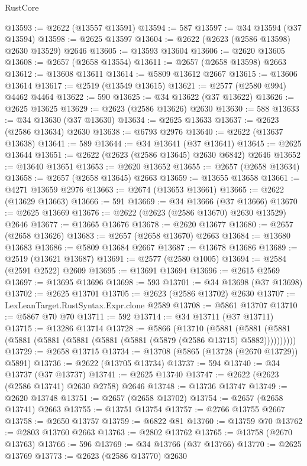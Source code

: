 \begin{lexlean}{RustCore}
\begin{coremodule}
@13593 := @2622 (@13557 @13591)
@13594 := 587
@13597 := @34 @13594 (@37 @13594)
@13598 := @2625 @13597
@13604 := @2622 (@2623 (@2586 @13598) @2630 @13529) @2646
@13605 := @13593 @13604
@13606 := @2620 @13605
@13608 := @2657 (@2658 @13554)
@13611 := @2657 (@2658 @13598) @2663
@13612 := @13608 @13611
@13614 := @5809 @13612 @2667
@13615 := @13606 @13614
@13617 := @2519 (@13549 @13615)
@13621 := @2577 (@2580 @994) @4462 @4464
@13622 := 590
@13625 := @34 @13622 (@37 @13622)
@13626 := @2625 @13625
@13629 := @2623 (@2586 @13626) @2630
@13630 := 588
@13633 := @34 @13630 (@37 @13630)
@13634 := @2625 @13633
@13637 := @2623 (@2586 @13634) @2630
@13638 := @6793 @2976
@13640 := @2622 (@13637 @13638)
@13641 := 589
@13644 := @34 @13641 (@37 @13641)
@13645 := @2625 @13644
@13651 := @2622 (@2623 (@2586 @13645) @2630 @6842) @2646
@13652 := @13640 @13651
@13653 := @2620 @13652
@13655 := @2657 (@2658 @13634)
@13658 := @2657 (@2658 @13645) @2663
@13659 := @13655 @13658
@13661 := @4271 @13659 @2976
@13663 := @2674 (@13653 @13661)
@13665 := @2622 (@13629 @13663)
@13666 := 591
@13669 := @34 @13666 (@37 @13666)
@13670 := @2625 @13669
@13676 := @2622 (@2623 (@2586 @13670) @2630 @13529) @2646
@13677 := @13665 @13676
@13678 := @2620 @13677
@13680 := @2657 (@2658 @13626)
@13683 := @2657 (@2658 @13670) @2663
@13684 := @13680 @13683
@13686 := @5809 @13684 @2667
@13687 := @13678 @13686
@13689 := @2519 (@13621 @13687)
@13691 := @2577 (@2580 @1005)
@13694 := @2584 (@2591 @2522) @2609
@13695 := @13691 @13694
@13696 := @2615 @2569
@13697 := @13695 @13696
@13698 := 593
@13701 := @34 @13698 (@37 @13698)
@13702 := @2625 @13701
@13705 := @2623 (@2586 @13702) @2630
@13707 := LexLeanTarget.RustSyntax.Expr.clone @2589
@13708 := @5861 @13707
@13710 := @5867 @70 @70
@13711 := 592
@13714 := @34 @13711 (@37 @13711)
@13715 := @13286 @13714
@13728 := @5866
    (@13710
      (@5881 (@5881 (@5881 (@5881 (@5881 (@5881 (@5881 (@5881 (@5879 (@2586 @13715) @5882))))))))))
@13729 := @2658 @13715
@13734 := @13708 (@5865 (@13728 (@2670 @13729)) @5891)
@13736 := @2622 (@13705 @13734)
@13737 := 594
@13740 := @34 @13737 (@37 @13737)
@13741 := @2625 @13740
@13747 := @2622 (@2623 (@2586 @13741) @2630 @2758) @2646
@13748 := @13736 @13747
@13749 := @2620 @13748
@13751 := @2657 (@2658 @13702)
@13754 := @2657 (@2658 @13741) @2663
@13755 := @13751 @13754
@13757 := @2766 @13755 @2667
@13758 := @2650 @13757
@13759 := @6822 @81
@13760 := @13759 @70
@13762 := @2803 @13760 @2663
@13763 := @2802 @13762
@13765 := @13758 (@2670 @13763)
@13766 := 596
@13769 := @34 @13766 (@37 @13766)
@13770 := @2625 @13769
@13773 := @2623 (@2586 @13770) @2630

\end{coremodule}
\end{lexlean}
